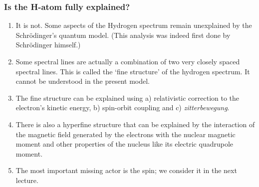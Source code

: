 \documentclass{beamer}
\begin{document}
\begin{frame}
\frametitle{Is the H-atom fully explained?}
\begin{enumerate}
\item It is not. Some aspects of the Hydrogen spectrum remain unexplained by the
Schr\"{o}dinger's quantum model. (This analysis was indeed first done by 
Schr\"{o}dinger himself.)
\item Some spectral lines are actually a combination of two very closely spaced
spectral lines. This is called the `fine structure' of the hydrogen spectrum. It
cannot be understood in the present model.
\item The fine structure can be explained using a) relativistic correction to 
the electron's kinetic energy, b) spin-orbit coupling and c) 
\emph{zitterbewegung}.
\item There is also a hyperfine structure that can be explained by the 
interaction of the magnetic field generated by the electrons with the nuclear
magnetic moment and other properties of the nucleus like its electric quadrupole
moment.
\item The most important missing actor is the spin; we consider it in the next 
lecture.
\end{enumerate}
\end{frame}
\end{document}
